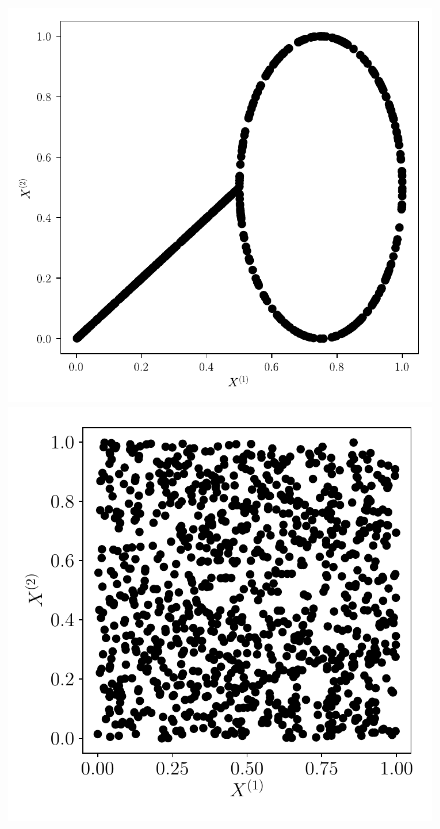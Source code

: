 \begin{figure}
\begin{minipage}{\textwidth}
\begin{minipage}{0.33\textwidth}
		\end{minipage}
		\begin{minipage}{0.33\textwidth}
			\includegraphics[width=\textwidth]{2som_mix001_in.pdf}
		\end{minipage}
		\begin{minipage}{0.33\textwidth}
			\includegraphics[width=\textwidth]{2som_square_in.pdf}
		\end{minipage}
	\end{minipage}
	
\end{figure}

